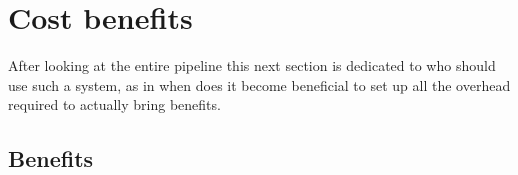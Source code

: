 %
%
%
%
%
%

\section{Cost benefits}
\label{sec:costbenefits}

After looking at the entire pipeline this next section is dedicated to who should use such a system, as in when does it become beneficial to set up all the overhead required to actually bring benefits.

\subsection{Benefits}

